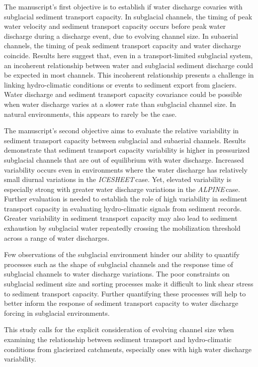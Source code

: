 \documentclass[tc, manuscript]{copernicus}
\newcommand{\alpine}{\textit{ALPINE}\,}
\newcommand{\icesheet}{\textit{ICESHEET}\,}
\begin{document}
The manuscript's first objective is to establish if water discharge covaries with subglacial sediment transport capacity.
In subglacial channels, the timing of peak water velocity and sediment transport capacity occurs before peak water discharge during a discharge event, due to evolving channel size.
In subaerial channels, the timing of peak sediment transport capacity and water discharge coincide.
Results here suggest that, even in a transport-limited subglacial system, an incoherent relationship between water and subglacial sediment discharge could be expected in most channels.
This incoherent relationship presents a challenge in linking hydro-climatic conditions or events to sediment export from glaciers.
Water discharge and sediment transport capacity covariance could be possible when water discharge varies at a slower rate than subglacial channel size.
In natural environments, this appears to rarely be the case.

The manuscript's second objective aims to evaluate the relative variability in sediment transport capacity between subglacial and subaerial channels.
Results demonstrate that sediment transport capacity variability is higher in pressurized subglacial channels that are out of equilibrium with water discharge.
Increased variability occurs even in environments where the water discharge has relatively small diurnal variations in the \icesheet case.
Yet, elevated variability is especially strong with greater water discharge variations in the \alpine case.
Further evaluation is needed to establish the role of high variability in sediment transport capacity in evaluating hydro-climatic signals from sediment records.
Greater variability in sediment transport capacity may also lead to sediment exhaustion by subglacial water repeatedly crossing the mobilization threshold across a range of water discharges. 

Few observations of the subglacial environment hinder our ability to quantify processes such as
the shape of subglacial channels and the response time of subglacial channels to water discharge variations.
The poor constraints on subglacial sediment size and sorting processes make it difficult to link shear stress to sediment transport capacity.
Further quantifying these processes will help to better inform the response of sediment transport capacity to water discharge forcing in subglacial environments.

This study calls for the explicit consideration of evolving channel size when examining the relationship between sediment transport and hydro-climatic conditions from glacierized catchments, especially ones with high water discharge variability.
\end{document}
